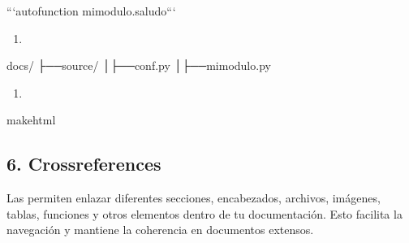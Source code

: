 \documentclass[a4paper,10pt,oneside,spanish,openany]{sphinxmanual}
\begin{document}
\begin{sphinxVerbatim}[commandchars=\\\{\}]


```\PYGZob{}autofunction\PYGZcb{} mi\PYGZus{}modulo.saludo```
\end{sphinxVerbatim}
\begin{enumerate}
%
\setcounter{enumi}{2}
\item {} 
\sphinxAtStartPar
{}

\end{enumerate}

\begin{sphinxVerbatim}[commandchars=\\\{\}]
docs/
├──source/
│├──conf.py
│├──mi\PYGZus{}modulo.py
\end{sphinxVerbatim}

\sphinxAtStartPar
{}

\begin{sphinxVerbatim}[commandchars=\\\{\}]
 
\end{sphinxVerbatim}
\begin{enumerate}
%
\setcounter{enumi}{3}
\item {} 
\sphinxAtStartPar
{}

\end{enumerate}

\begin{sphinxVerbatim}[commandchars=\\\{\}]
makehtml
\end{sphinxVerbatim}


\subsection{6. Cross\sphinxhyphen{}references}
\label{\detokenize{configuracion_inicial/013.guia_de_myst_parser:cross-references}}
\sphinxAtStartPar
Las  permiten enlazar diferentes secciones, encabezados, archivos, imágenes, tablas, funciones y otros elementos dentro de tu documentación. Esto facilita la navegación y mantiene la coherencia en documentos extensos.
\end{document}
